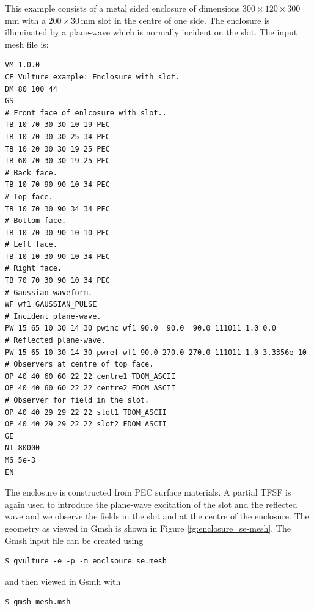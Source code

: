 \documentclass[onecolumn,a4paper]{article}
\numberwithin{equation}{section}
\begin{document}
This example consists of a metal sided enclosure of dimensions $300\times 120\times 300$\,mm with a $200\times 30$\,mm slot in the centre of one
side. The enclosure is illuminated by a plane-wave which is normally incident on the slot. 
The input mesh file is:
\begin{verbatim}
VM 1.0.0
CE Vulture example: Enclosure with slot.
DM 80 100 44
GS
# Front face of enlcosure with slot..
TB 10 70 30 30 10 19 PEC
TB 10 70 30 30 25 34 PEC
TB 10 20 30 30 19 25 PEC
TB 60 70 30 30 19 25 PEC
# Back face.
TB 10 70 90 90 10 34 PEC
# Top face.
TB 10 70 30 90 34 34 PEC
# Bottom face.
TB 10 70 30 90 10 10 PEC
# Left face.
TB 10 10 30 90 10 34 PEC
# Right face.
TB 70 70 30 90 10 34 PEC
# Gaussian waveform.
WF wf1 GAUSSIAN_PULSE
# Incident plane-wave.
PW 15 65 10 30 14 30 pwinc wf1 90.0  90.0  90.0 111011 1.0 0.0
# Reflected plane-wave.
PW 15 65 10 30 14 30 pwref wf1 90.0 270.0 270.0 111011 1.0 3.3356e-10
# Observers at centre of top face.
OP 40 40 60 60 22 22 centre1 TDOM_ASCII
OP 40 40 60 60 22 22 centre2 FDOM_ASCII
# Observer for field in the slot.
OP 40 40 29 29 22 22 slot1 TDOM_ASCII
OP 40 40 29 29 22 22 slot2 FDOM_ASCII
GE
NT 80000
MS 5e-3
EN
\end{verbatim}
The enclosure is constructed from PEC surface materials. A partial TFSF is again used to introduce the plane-wave 
excitation of the slot and the reflected wave and we observe the fields in the slot and at the centre of the enclosure.
The geometry as viewed in Gmsh is shown in Figure \ref{fg:enclosure_se-mesh}. The Gmsh input file can be created using
\begin{verbatim}
$ gvulture -e -p -m enclsoure_se.mesh
\end{verbatim}
and then viewed in Gsmh with
\begin{verbatim}
$ gmsh mesh.msh
\end{verbatim}
\end{document}

